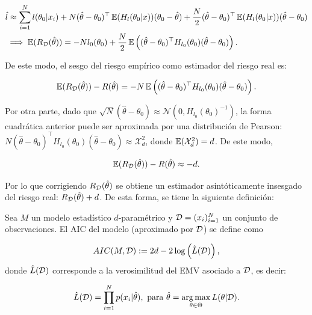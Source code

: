 \begin{align}
	&\hat{l} \approx \sum_{i=1}^N l(\theta_0|x_i) + N(\hat{\theta}-\theta_0)^\top \operatorname{\mathbb{E}}(H_l(\theta_0|x)) (\theta_0-\hat{\theta}) + \frac{N}{2}(\hat{\theta}-\theta_0)^\top \operatorname{\mathbb{E}}(H_l(\theta_0|x)) (\hat{\theta}-\theta_0)\\
	&\implies \operatorname{\mathbb{E}}(R_{\mathcal D}(\hat{\theta})) = -Nl_0(\theta_0) + \frac{N}{2} \operatorname{\mathbb{E}}\left((\hat{\theta}-\theta_0)^\top H_{l_0}(\theta_0) (\hat{\theta}-\theta_0)\right).
\end{align}

De este modo, el sesgo del riesgo empírico como estimador del riesgo real es:

\begin{equation*}
	\operatorname{\mathbb{E}}(R_{\mathcal D}(\hat{\theta})) - R(\hat{\theta}) = -N \operatorname{\mathbb{E}}\left((\hat{\theta}-\theta_0)^\top H_{l_0}(\theta_0) (\hat{\theta}-\theta_0)\right).
\end{equation*}

Por otra parte, dado que $\sqrt{N}\left(\hat{\theta}-\theta_0\right)\approx\mathcal{N}\left(0,H_{l_0}(\theta_0)^{-1}\right)$, la forma cuadrática anterior puede ser aproximada por una distribución de Pearson: $N(\hat{\theta}-\theta_0)^\top H_{l_0}(\theta_0) (\hat{\theta}-\theta_0)\approx\mathcal{X}^2_d$, donde $\operatorname{\mathbb{E}}(\mathcal{X}^2_d)=d$. De este modo,

\begin{equation}
	\operatorname{\mathbb{E}}(R_{\mathcal D}(\hat{\theta})) - R(\hat{\theta}) \approx -d.
\end{equation}

Por lo que corrigiendo $R_{\mathcal D}(\hat{\theta})$ se obtiene un estimador asintóticamente insesgado del riesgo real: $R_{\mathcal D}(\hat{\theta})+d$. De esta forma, se tiene la siguiente definición:

\begin{definition}[AIC]
	Sea $M$ un modelo estadístico $d$-paramétrico y ${\mathcal D}=(x_i)_{i=1}^N$ un conjunto de observaciones. El AIC del modelo (aproximado por ${\mathcal D}$) se define como
	
	\begin{equation}
		AIC(M,{\mathcal D}):=2d-2\log\left(\hat{L}({\mathcal D})\right),
	\end{equation}
donde $\hat{L}({\mathcal D})$ corresponde a la verosimilitud del EMV asociado a ${\mathcal D}$, es decir:
	
	\begin{equation}
		\hat{L}({\mathcal D}) = \prod_{i=1}^N p(x_i|\hat{\theta}),\text{ para } \hat{\theta} = \operatorname*{arg\,max}_{\theta\in\Theta} L(\theta|{\mathcal D}).
	\end{equation}
\end{definition}

